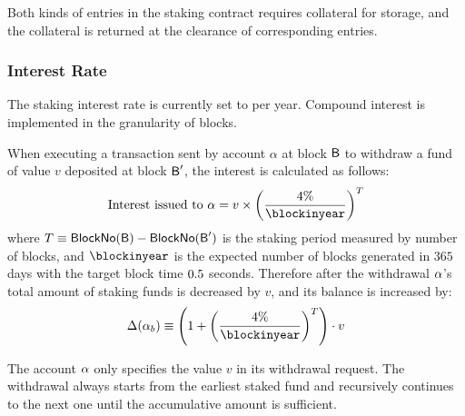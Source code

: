 Both kinds of entries in the staking contract requires collateral for storage, and the collateral is returned at the clearance of corresponding entries.



\subsubsection{Interest Rate}

The staking interest rate is currently set to \interest per year.
Compound interest is implemented in the granularity of blocks.

When executing a transaction sent by account $\alpha$ at block $\textsf{B}$ to withdraw a fund of value $v$ deposited at block $\textsf{B}'$,
the interest is calculated as follows:
\begin{align}
	\text{Interest issued to $\account$} 
	= v \times \left(\frac{\interest}{\blockinyear}\right)^T
\end{align}
where $T\equiv\mathsf{BlockNo}(\textsf{B}) - \mathsf{BlockNo}(\textsf{B}')$ is the staking period measured by number of blocks, 
and $\blockinyear$ is the expected number of blocks generated in $365$ days with the target block time $0.5$ seconds.
% 
Therefore after the withdrawal $\mathbf{\alpha}$'s total amount of staking funds is decreased by $v$,
and its balance is increased by:
\begin{align}
	\Delta(\account_b) \eqdef 
		\left(1+ \left( \frac{ \interest }{\blockinyear} \right)^T \right) \cdot v 
\end{align}

The account $\mathbf{\alpha}$ only specifies the value $v$ in its withdrawal request. 
The withdrawal always starts from the earliest staked fund and recursively continues to the next one until the accumulative amount is sufficient.

